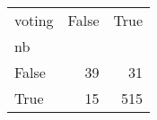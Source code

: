 \begin{tabular}{lrr}
\toprule
voting &  False &  True  \\
nb    &        &        \\
\midrule
False &     39 &     31 \\
True  &     15 &    515 \\
\bottomrule
\end{tabular}
